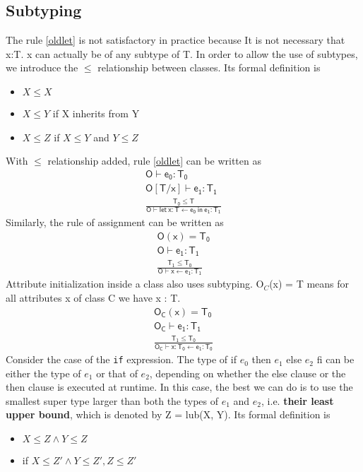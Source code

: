 \subsection{Subtyping} 
The rule \eqref{oldlet} is not satisfactory in practice because It is not necessary that x:T. {\sf x} can actually be of any subtype of T.  In order to allow the use of subtypes, we introduce the $\leq$ relationship between classes. Its formal definition is 
\begin{itemize}
\item $X\leq X$
\item $X\leq Y$ if X inherits from Y
\item $X\leq Z$ if $X\leq Y$ and $Y\leq Z$
\end{itemize}
With $\leq$ relationship added, rule \eqref{oldlet} can be written as 
\begin{gather*}
\mathsf{O\vdash e_0:T_0}\\
\mathsf{O[T/x]\vdash e_1:T_1}\\
\mathsf{\frac{T_0\leq T}{ O\vdash let\:x:T\leftarrow e_0\:in\:e_1:T_1}}
\end{gather*}
Similarly, the rule of assignment can be written as
\begin{gather*}
\mathsf{O(x) = T_0}\\
\mathsf{O\vdash e_1:T_1}\\
\mathsf{\frac{T_1\leq T_0}{ O\vdash x\leftarrow e_1:T_1}}
\end{gather*}
Attribute initialization inside a class also uses subtyping. O$_C$(x) = T means for all attributes x of class C we have x : T.
\begin{gather*}
\mathsf{O_C(x)=T_0}\\
\mathsf{O_C\vdash e_1:T_1}\\
\mathsf{\frac{T_1\leq T_0}{ O_C\vdash x:T_0\leftarrow e_1:T_0}}
\end{gather*}
Consider the case of the \texttt{if} expression. The type of {\sf if $e_0$ then $e_1$ else $e_2$ fi} can be either the type of $e_1$ or that of $e_2$, depending on whether the else clause or the then clause is executed at runtime. In this case, the best we can do is to use the smallest super type larger than both the types of $e_1$ and $e_2$, i.e. \textbf{their least upper bound}, which is denoted by {\sf Z = lub(X, Y)}. Its formal definition is 
\begin{itemize}
\item $X\leq Z\land Y\leq Z$
\item if $X\leq Z'\land Y\leq Z', Z\leq Z'$
\end{itemize}
